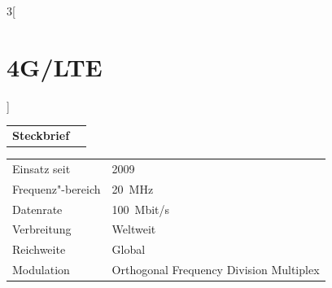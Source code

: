 \begin{multicols}{3}[\section{4G/LTE}]


\newrefsegment

\begin{tabular}{p{}p{2.7 cm}}
\textbf{Steckbrief}& \\
\end{tabular}
\begin{tabular}{p{}p{2.7 cm}}
      Einsatz seit & 2009\\
      Frequenz"-bereich  & \SI{20}{\mega\hertz}\\
      Datenrate & \SI{100}{Mbit/s}\\
      Verbreitung & Weltweit\\
      Reichweite & Global\\
      Modulation & Orthogonal Frequency Division Multiplex\\
\end{tabular}
\par

\end{multicols}
